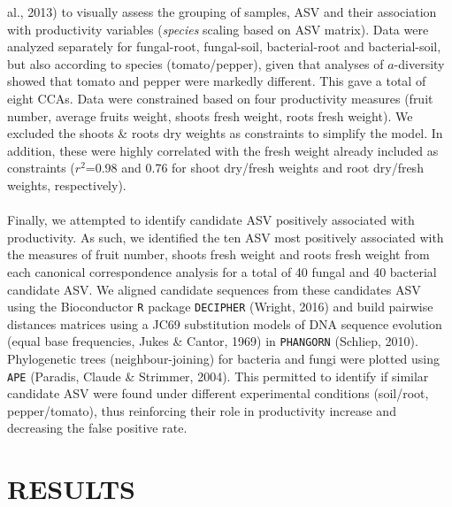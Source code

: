 \documentclass[12pt,]{article}
\begin{document}
al., 2013) to visually assess the grouping of samples, ASV and their
association with productivity variables (\emph{species} scaling based on
ASV matrix). Data were analyzed separately for fungal-root, fungal-soil,
bacterial-root and bacterial-soil, but also according to species
(tomato/pepper), given that analyses of \(a\)-diversity showed that
tomato and pepper were markedly different. This gave a total of eight
CCAs. Data were constrained based on four productivity measures (fruit
number, average fruits weight, shoots fresh weight, roots fresh weight).
We excluded the shoots \& roots dry weights as constraints to simplify
the model. In addition, these were highly correlated with the fresh
weight already included as constraints (\(r^2\)=0.98 and 0.76 for shoot
dry/fresh weights and root dry/fresh weights, respectively).\\
\hspace*{0.333em}\\
Finally, we attempted to identify candidate ASV positively associated
with productivity. As such, we identified the ten ASV most positively
associated with the measures of fruit number, shoots fresh weight and
roots fresh weight from each canonical correspondence analysis for a
total of 40 fungal and 40 bacterial candidate ASV. We aligned candidate
sequences from these candidates ASV using the Bioconductor \texttt{R}
package \texttt{DECIPHER} (Wright, 2016) and build pairwise distances
matrices using a JC69 substitution models of DNA sequence evolution
(equal base frequencies, Jukes \& Cantor, 1969) in \texttt{PHANGORN}
(Schliep, 2010). Phylogenetic trees (neighbour-joining) for bacteria and
fungi were plotted using \texttt{APE} (Paradis, Claude \& Strimmer,
2004). This permitted to identify if similar candidate ASV were found
under different experimental conditions (soil/root, pepper/tomato), thus
reinforcing their role in productivity increase and decreasing the false
positive rate.\\
\hspace*{0.333em}

\newpage  

\section{RESULTS}\label{results}
\end{document}
